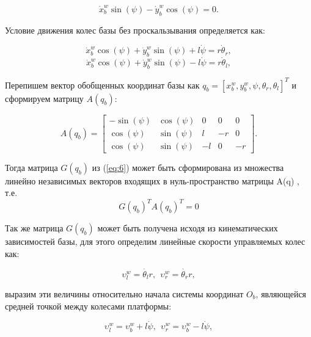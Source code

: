 \documentclass[14pt, a4paper]{extreport}
\begin{document}
\begin{equation}
\dot{x}^w_b\sin(\psi) - \dot{y}^w_b\cos(\psi) = 0.
\tag{8} \label{eq:8}
\end{equation}

Условие движения колес базы без проскальзывания определяется как:

\begin{equation}
\dot{x}^w_b\cos(\psi) + \dot{y}^w_b\sin(\psi) + l\dot{\psi} = r\dot{\theta}_r,
\tag{9} \label{eq:9}
\end{equation}
\begin{equation}
\dot{x}^w_b\cos(\psi) + \dot{y}^w_b\sin(\psi) - l\dot{\psi} = r\dot{\theta}_l,
\tag{10} \label{eq:10}
\end{equation}

Перепишем вектор обобщенных координат базы как $q_b = [x^w_b, y^w_b, \psi, \theta_r, \theta_l]^T$ и сформируем матрицу $A(q_b)$:

\begin{equation}
A(q_b) = 
\begin{bmatrix}
-\sin(\psi) & \cos(\psi) & 0 & 0 & 0 \\[1mm]
\cos(\psi) & \sin(\psi) & l & -r & 0 \\[1mm]
\cos(\psi) & \sin(\psi) & -l & 0 & -r
\end{bmatrix}.
\tag{11} \label{eq:11}
\end{equation}

Тогда матрица $G(q_b)$ из (\ref{eq:6}) может быть сформирована из множества линейно независимых векторов входящих в нуль-пространство матрицы A(q) \cite{Li}, т.е.
\begin{equation}
G(q_b)^T A(q_b)^T = 0
\tag{12} \label{eq:12}
\end{equation}
\newpage

Так же матрица $G(q_b)$ может быть получена исходя из кинематических зависимостей базы, для этого определим линейные скорости управляемых колес как:

\begin{equation}
\upsilon_l^w = \dot{\theta{_l}}r,\ \ \upsilon_r^w = \dot{\theta{_r}}r,
\tag{13} \label{eq:13}
\end{equation}

\noindent
выразим эти величины относительно начала системы координат $O_b$, являющейся средней точкой между колесами платформы:

\begin{equation}
\upsilon_l^w = \upsilon_b^w + l\dot{\psi} ,\ \ \upsilon_r^w = \upsilon_b^w - l\dot{\psi},
\tag{14} \label{eq:14}
\end{equation}
\end{document}
